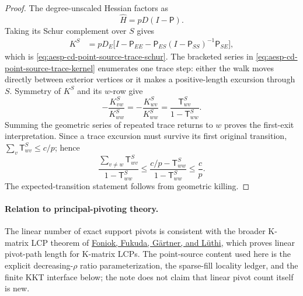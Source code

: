 \begin{proof}
The degree-unscaled Hessian factors as
\begin{equation*}
 \widehat H=pD(I-\mathsf P).
\end{equation*}
Taking its Schur complement over $S$ gives
\begin{align*}
 K^S
 &=pD_E\bigl[
   I-\mathsf P_{EE}
   -\mathsf P_{ES}(I-\mathsf P_{SS})^{-1}\mathsf P_{SE}
  \bigr],
\end{align*}
which is \cref{eq:aesp-cd-point-source-trace-schur}.  The bracketed series
in \cref{eq:aesp-cd-point-source-trace-kernel} enumerates one trace step:
either the walk moves directly between exterior vertices or it makes a
positive-length excursion through $S$.  Symmetry of $K^S$ and its
$w$-row give
\begin{equation*}
 -\frac{K^S_{vw}}{K^S_{ww}}
 =-\frac{K^S_{wv}}{K^S_{ww}}
 =\frac{\mathsf T^S_{wv}}{1-\mathsf T^S_{ww}}.
\end{equation*}
Summing the geometric series of repeated trace returns to $w$ proves the
first-exit interpretation.  Since a trace excursion must survive its first
original transition, \(\sum_v\mathsf T^S_{wv}\leq c/p\); hence
\begin{equation*}
 \frac{\sum_{v\ne w}\mathsf T^S_{wv}}
      {1-\mathsf T^S_{ww}}
 \leq\frac{c/p-\mathsf T^S_{ww}}
           {1-\mathsf T^S_{ww}}
 \leq\frac cp.
\end{equation*}
The expected-transition statement follows from geometric killing.
\end{proof}

\paragraph{Relation to principal-pivoting theory.}
The linear number of exact support pivots is consistent with the broader
K-matrix LCP theorem of
\href{https://arxiv.org/abs/0807.1249}{Foniok, Fukuda, G\"artner, and
L\"uthi}, which proves linear pivot-path length for K-matrix LCPs.  The
point-source content used here is the explicit decreasing-\(\rho\) ratio
parameterization, the sparse-fill locality ledger, and the finite KKT
interface below; the note does not claim that linear pivot count itself is
new.

